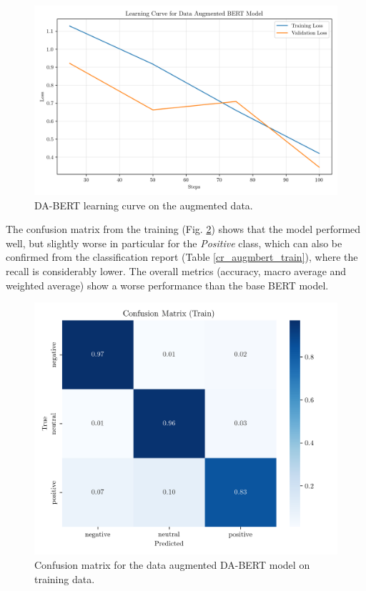 \documentclass[conference]{IEEEtran}
\begin{document}
\begin{figure}[H]
    \centering
    \includegraphics[width=1\linewidth]{assets/data_augmented_bert_learninc_curve.png}
    \caption{DA-BERT learning curve on the augmented data.}
    \label{fig:data_augmented_bert_learninc_curve}
\end{figure}



The confusion matrix from the training (Fig. \ref{fig:dataaugmented_bert_confusion_matrix_Train}) shows that the model performed well, but slightly worse in particular for the \textit{Positive} class, which can also be confirmed from the classification report (Table \ref{cr_augmbert_train}), where the recall is considerably lower. The overall metrics (accuracy, macro average and weighted average) show a worse performance than the base BERT model.

\begin{figure}[H]
    \centering
    \includegraphics[width=1\linewidth]{assets/dataaugmented_bert_confusion_matrix_Train.png}
    \caption{Confusion matrix for the data augmented DA-BERT model on training data.}
    \label{fig:dataaugmented_bert_confusion_matrix_Train}
\end{figure}
\end{document}
